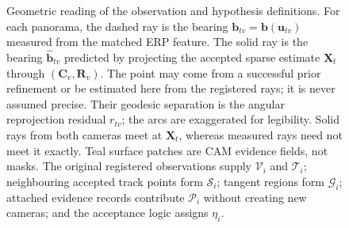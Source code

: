 \documentclass[a4paper,9pt]{extarticle}
\begin{document}
\begin{figure}[t]
\caption{Geometric reading of the observation and hypothesis definitions. For each panorama, the dashed ray is the bearing $\mathbf b_{tv}=\mathbf b(\mathbf u_{tv})$ measured from the matched ERP feature. The solid ray is the bearing $\widehat{\mathbf b}_{tv}$ predicted by projecting the accepted sparse estimate $\mathbf X_t$ through $(\mathbf C_v,\mathbf R_v)$. The point may come from a successful prior refinement or be estimated here from the registered rays; it is never assumed precise. Their geodesic separation is the angular reprojection residual $r_{tv}$; the arcs are exaggerated for legibility. Solid rays from both cameras meet at $\mathbf X_t$, whereas measured rays need not meet it exactly. Teal surface patches are CAM evidence fields, not masks. The original registered observations supply $\mathcal V_i$ and $\mathcal T_i$; neighbouring accepted track points form $\mathcal S_i$; tangent regions form $\mathcal G_i$; attached evidence records contribute $\mathcal P_i$ without creating new cameras; and the acceptance logic assigns $\eta_i$.}
\label{fig:problem}
\end{figure}
\end{document}
